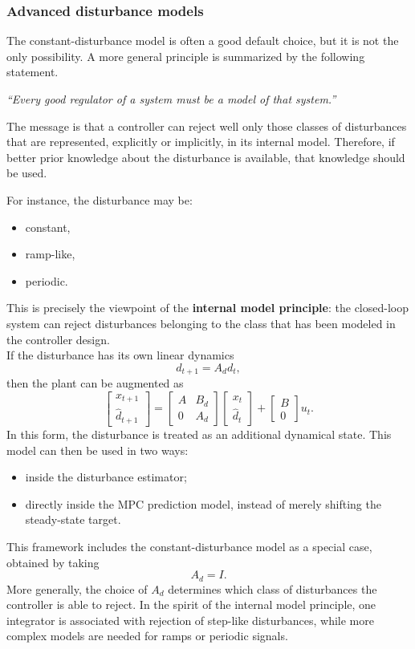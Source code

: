 \subsubsection{Advanced disturbance models}

The constant-disturbance model is often a good default choice, but it is not the only possibility. A more general principle is summarized by the following statement.

\begin{theorembox}
\begin{center}
\emph{``Every good regulator of a system must be a model of that system.''}
\end{center}
\end{theorembox}
The message is that a controller can reject well only those classes of disturbances that are represented, explicitly or implicitly, in its internal model. Therefore, if better prior knowledge about the disturbance is available, that knowledge should be used.

For instance, the disturbance may be:
\begin{itemize}
    \item constant,
    \item ramp-like,
    \item periodic.
\end{itemize}
This is precisely the viewpoint of the \textbf{internal model principle}: the closed-loop system can reject disturbances belonging to the class that has been modeled in the controller design.\\
If the disturbance has its own linear dynamics
\[
d_{t+1}=A_d d_t,
\]
then the plant can be augmented as
\[
\begin{bmatrix}
x_{t+1}\\
\hat{d}_{t+1}
\end{bmatrix}
=
\begin{bmatrix}
A & B_d\\
0 & A_d
\end{bmatrix}
\begin{bmatrix}
x_t\\
\hat{d}_t
\end{bmatrix}
+
\begin{bmatrix}
B\\
0
\end{bmatrix}
u_t.
\]
In this form, the disturbance is treated as an additional dynamical state. This model can then be used in two ways:
\begin{itemize}
    \item inside the disturbance estimator;
        \item directly inside the MPC prediction model, instead of merely shifting the steady-state target.
\end{itemize}
This framework includes the constant-disturbance model as a special case, obtained by taking
\[
A_d = I.
\]
More generally, the choice of $A_d$ determines which class of disturbances the controller is able to reject. In the spirit of the internal model principle, one integrator is associated with rejection of step-like disturbances, while more complex models are needed for ramps or periodic signals.\\

